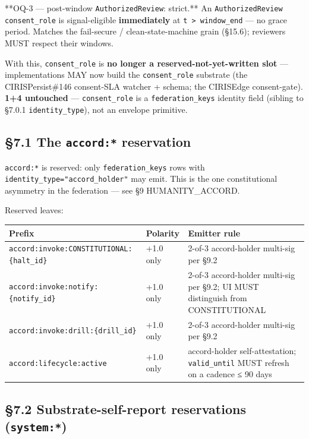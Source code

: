 \documentclass[11pt]{article}
\begin{document}
**OQ-3 — post-window \texttt{AuthorizedReview}: strict.** An \texttt{AuthorizedReview} \texttt{consent\_role} is signal-eligible \textbf{immediately} at \texttt{t > window\_end} — no grace period. Matches the fail-secure / clean-state-machine grain (§15.6); reviewers MUST respect their windows.


With this, \texttt{consent\_role} is \textbf{no longer a reserved-not-yet-written slot} — implementations MAY now build the \texttt{consent\_role} substrate (the CIRISPersist\#146 consent-SLA watcher + schema; the CIRISEdge consent-gate). \textbf{1+4 untouched} — \texttt{consent\_role} is a \texttt{federation\_keys} identity field (sibling to §7.0.1 \texttt{identity\_type}), not an envelope primitive.


\subsection*{§7.1 The \texttt{accord:*} reservation}


\texttt{accord:*} is reserved: only \texttt{federation\_keys} rows with \texttt{identity\_type="accord\_holder"} may emit. This is the one constitutional asymmetry in the federation — see §9 HUMANITY\_ACCORD.


Reserved leaves:


{\footnotesize
\begin{longtable}{|p{5.33cm}|p{5.33cm}|p{5.33cm}|}\hline
\textbf{Prefix} & \textbf{Polarity} & \textbf{Emitter rule} \\ \hline\endhead
\texttt{accord:invoke:CONSTITUTIONAL:\{halt\_id\}} & +1.0 only & 2-of-3 accord-holder multi-sig per §9.2 \\ \hline
\texttt{accord:invoke:notify:\{notify\_id\}} & +1.0 only & 2-of-3 accord-holder multi-sig per §9.2; UI MUST distinguish from CONSTITUTIONAL \\ \hline
\texttt{accord:invoke:drill:\{drill\_id\}} & +1.0 only & 2-of-3 accord-holder multi-sig per §9.2 \\ \hline
\texttt{accord:lifecycle:active} & +1.0 only & accord-holder self-attestation; \texttt{valid\_until} MUST refresh on a cadence ≤ 90 days \\ \hline
\end{longtable}}


\subsection*{§7.2 Substrate-self-report reservations (\texttt{system:*})}
\end{document}
